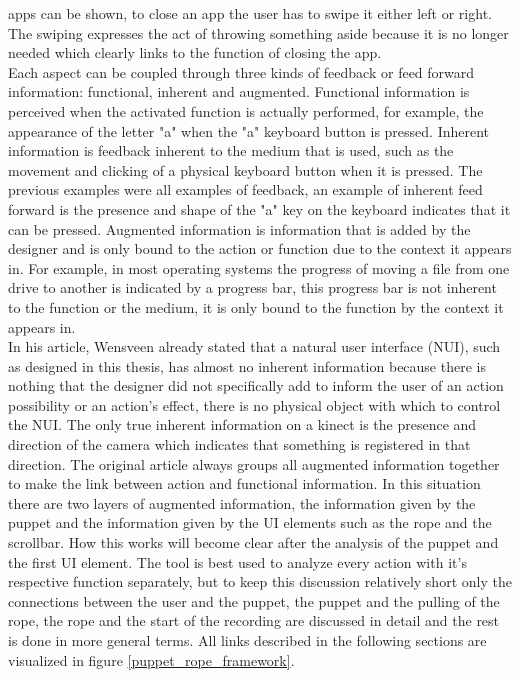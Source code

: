 apps can be shown, to close an app the user has to swipe it either left or right. The swiping expresses the act of throwing something aside because it is no longer needed which clearly links to the function of closing the app.\\

Each aspect can be coupled through three kinds of feedback or feed forward information: functional, inherent and augmented. Functional information is perceived when the activated function is actually performed, for example, the appearance of the letter "a" when the "a" keyboard button is pressed. Inherent information is feedback inherent to the medium that is used, such as the movement and clicking of a physical keyboard button when it is pressed. The previous examples were all examples of feedback, an example of inherent feed forward is the presence and shape of the "a" key on the keyboard indicates that it can be pressed. Augmented information is information that is added by the designer and is only bound to the action or function due to the context it appears in. For example, in most operating systems the progress of moving a file from one drive to another is indicated by a progress bar, this progress bar is not inherent to the function or the medium, it is only bound to the function by the context it appears in.\\

In his article, Wensveen already stated that a natural user interface (NUI), such as designed in this thesis, has almost no inherent information because there is nothing that the designer did not specifically add to inform the user of an action possibility or an action's effect, there is no physical object with which to control the NUI. The only true inherent information on a kinect is the presence and direction of the camera which indicates that something is registered in that direction. The original article always groups all augmented information together to make the link between action and functional information. In this situation there are two layers of augmented information, the information given by the puppet and the information given by the UI elements such as the rope and the scrollbar. How this works will become clear after the analysis of the puppet and the first UI element. The tool is best used to analyze every action with it's respective function separately,  but to keep this discussion relatively short only the connections between the user and the puppet, the puppet and the pulling of the rope, the rope and the start of the recording are discussed in detail and the rest is done in more general terms. All links described in the following sections are visualized in figure \ref{puppet_rope_framework}.\\

